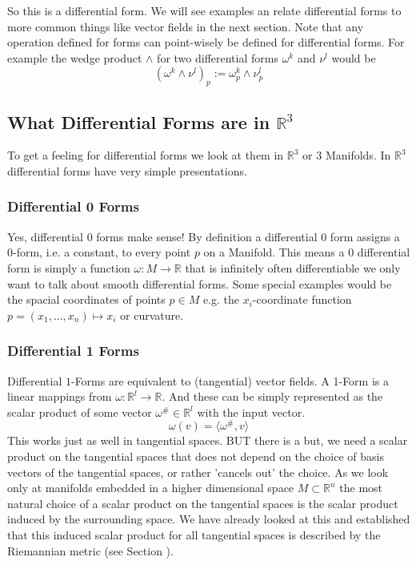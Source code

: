 So this is a differential form. We will see examples an relate differential forms to more common things like vector fields in the next section. Note that any operation defined for forms can point-wisely be defined for differential forms. For example the wedge product $\wedge$ for two differential forms $\omega^k$ and $\nu^l$ would be
\[(\omega^k\wedge \nu^l)_p := \omega^k_p\wedge \nu^l_p\]


\subsection{What Differential Forms are in $\mathbb{R}^3$}
To get a feeling for differential forms we look at them in $\mathbb R^3$ or 3 Manifolds. In $\mathbb R^3$ differential forms have very simple presentations.

\subsubsection{Differential 0 Forms}
Yes, differential 0 forms make sense! By definition a differential 0 form assigns a 0-form, i.e. a constant, to every point $p$ on a Manifold. This means a 0 differential form is simply a function $\omega: M \to \mathbb R$ that is infinitely  often differentiable we only want to talk about smooth differential forms. Some special examples would be the spacial coordinates of points $p \in M$ e.g. the $x_i$-coordinate function $ p = (x_1,...,x_n) \mapsto x_i$ or curvature.


\subsubsection*{Differential 1 Forms}
Differential $1$-Forms are equivalent to (tangential) vector fields. A 1-Form is a linear mappings from $\omega: \mathbb R^l \rightarrow \mathbb R$. And these can be simply represented as the scalar product of some vector $\omega^{\#} \in \mathbb R ^l$ with the input vector.
\[\omega(v) = \langle \omega^{\#}, v \rangle\]
This works just as well in tangential spaces. BUT there is a but, we need a scalar product on the tangential spaces that does not depend on the choice of basis vectors of the tangential spaces, or rather 'cancels out' the choice. As we look only at manifolds embedded in a higher dimensional space $M \subset \mathbb R^n$ the most natural choice of a scalar product on the tangential spaces is the scalar product induced by the surrounding space. We have already looked at this and established that this induced scalar product for all tangential spaces is described by the Riemannian metric (see Section ). 

